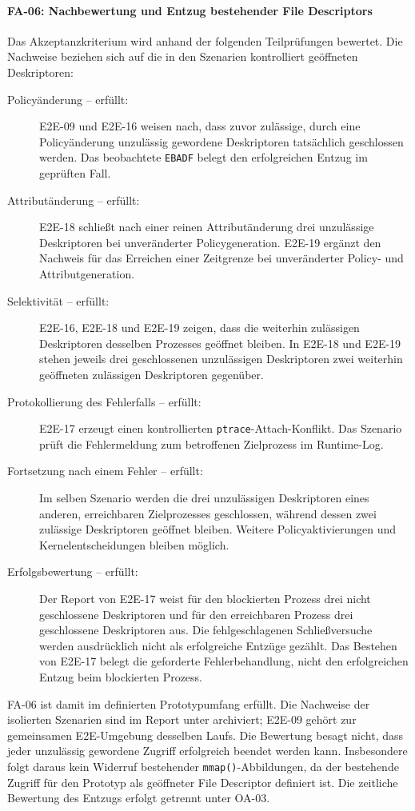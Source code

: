 \paragraph{FA-06: Nachbewertung und Entzug bestehender File Descriptors}
Das Akzeptanzkriterium wird anhand der folgenden Teilprüfungen bewertet. Die Nachweise beziehen
sich auf die in den Szenarien kontrolliert geöffneten Deskriptoren:
\begin{description}
    \item[Policyänderung -- erfüllt:] E2E-09 und E2E-16 weisen nach, dass zuvor zulässige,
    durch eine Policyänderung unzulässig gewordene Deskriptoren tatsächlich geschlossen werden.
    Das beobachtete \texttt{EBADF} belegt den erfolgreichen Entzug im geprüften Fall.
    \item[Attributänderung -- erfüllt:] E2E-18 schließt nach einer reinen Attributänderung
    drei unzulässige Deskriptoren bei unveränderter Policygeneration. E2E-19 ergänzt den
    Nachweis für das Erreichen einer Zeitgrenze bei unveränderter Policy- und Attributgeneration.
    \item[Selektivität -- erfüllt:] E2E-16, E2E-18 und E2E-19 zeigen, dass die weiterhin
    zulässigen Deskriptoren desselben Prozesses geöffnet bleiben. In E2E-18 und E2E-19 stehen
    jeweils drei geschlossenen unzulässigen Deskriptoren zwei weiterhin geöffneten zulässigen
    Deskriptoren gegenüber.
    \item[Protokollierung des Fehlerfalls -- erfüllt:] E2E-17 erzeugt einen kontrollierten
    \texttt{ptrace}-Attach-Konflikt. Das Szenario prüft die Fehlermeldung zum betroffenen
    Zielprozess im Runtime-Log.
    \item[Fortsetzung nach einem Fehler -- erfüllt:] Im selben Szenario werden die drei
    unzulässigen Deskriptoren eines anderen, erreichbaren Zielprozesses geschlossen, während
    dessen zwei zulässige Deskriptoren geöffnet bleiben. Weitere Policyaktivierungen und
    Kernelentscheidungen bleiben möglich.
    \item[Erfolgsbewertung -- erfüllt:] Der Report von E2E-17 weist für den blockierten
    Prozess drei nicht geschlossene Deskriptoren und für den erreichbaren Prozess drei
    geschlossene Deskriptoren aus. Die fehlgeschlagenen Schließversuche werden ausdrücklich
    nicht als erfolgreiche Entzüge gezählt. Das Bestehen von E2E-17 belegt die geforderte
    Fehlerbehandlung, nicht den erfolgreichen Entzug beim blockierten Prozess.
\end{description}
FA-06 ist damit im definierten Prototypumfang erfüllt. Die Nachweise der isolierten Szenarien
sind im Report unter
archiviert; E2E-09 gehört zur gemeinsamen E2E-Umgebung desselben Laufs.
Die Bewertung besagt nicht, dass jeder unzulässig gewordene Zugriff erfolgreich beendet werden
kann. Insbesondere folgt daraus kein Widerruf bestehender \texttt{mmap()}-Abbildungen, da der
bestehende Zugriff für den Prototyp als geöffneter File Descriptor definiert ist. Die zeitliche
Bewertung des Entzugs erfolgt getrennt unter OA-03.

